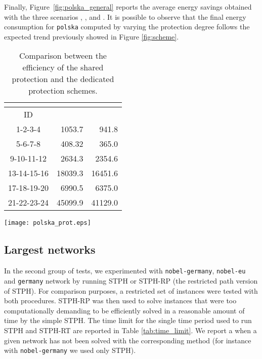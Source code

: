 \documentclass[final,5p,times,twocolumn]{elsarticle}
\begin{document}
Finally, Figure~\ref{fig:polska_general} reports the average energy savings obtained with the three scenarios , , and .  It is possible to observe that the final energy consumption for {\tt polska} computed by varying the protection degree follows the expected trend previously showed in Figure \ref{fig:scheme}.

\begin{table}[!ht]\footnotesize
\tabcolsep 6pt
\caption{Comparison between the efficiency of the shared protection and the dedicated protection schemes.}
\begin{center}
\begin{tabular}{crr}

\multicolumn{1}{c}{} & \multicolumn{1}{c}{}& \multicolumn{1}{c}{} \\
\hline
 ID   & 	&    \\
\hline                      
1-2-3-4     & 1053.7  &  941.8 \\
5-6-7-8     & 408.32  &  365.0 \\
9-10-11-12  & 2634.3  & 2354.6 \\
\hline
13-14-15-16 & 18039.3 &16451.6 \\
17-18-19-20 & 6990.5  & 6375.0 \\ 
21-22-23-24 & 45099.9 &41129.0 \\ 
\hline
\end{tabular}
\end{center}
\label{tab_sh_nominal}
\end{table}





\begin{figure*}[t]\centering
  \texttt{[image: polska\_prot.eps]}
  \caption{Energy savings achieved by STPH when implementing the different protection schemes on {\tt polska} instances.}
\label{fig:polska_general}
\end{figure*}


\subsection{Largest networks}\label{sec:large}

In the second group of tests, we experimented with {\tt nobel-germany}, {\tt nobel-eu} and {\tt germany} network by running STPH or STPH-RP (the restricted path version of STPH). For comparison purposes, a restricted set of instances were tested with both procedures. STPH-RP was then used to solve instances that were too computationally  demanding to be efficiently solved in a reasonable amount of time by the simple STPH. The time limit for the single time period used to run STPH and STPH-RT are reported in Table \ref{tab:time_limit}. We report a  when a given network has not been solved with the corresponding method (for instance with {\tt nobel-germany} we used only STPH). 
\end{document}
